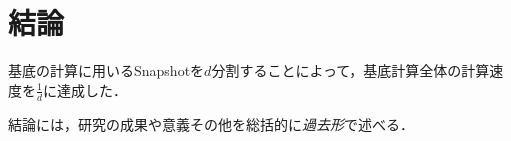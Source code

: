 \documentclass[a4j,12pt]{jreport}
\begin{document}
\chapter{結論}
基底の計算に用いるSnapshotを$d$分割することによって，基底計算全体の計算速度を$\frac{1}{d}$に達成した．






結論には，研究の成果や意義その他を総括的に{\em 過去形}で述べる．
\end{document}

